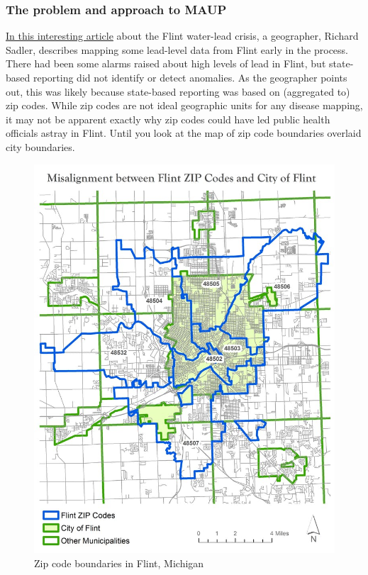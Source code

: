 \documentclass[
]{book}
\begin{document}
\hypertarget{the-problem-and-approach-to-maup}{%
\subsubsection{The problem and approach to MAUP}\label{the-problem-and-approach-to-maup}}

\href{https://theconversation.com/how-zip-codes-nearly-masked-the-lead-problem-in-flint-65626}{In this interesting article} about the Flint water-lead crisis, a geographer, Richard Sadler, describes mapping some lead-level data from Flint early in the process. There had been some alarms raised about high levels of lead in Flint, but state-based reporting did not identify or detect anomalies. As the geographer points out, this was likely because state-based reporting was based on (aggregated to) zip codes. While zip codes are not ideal geographic units for any disease mapping, it may not be apparent exactly why zip codes could have led public health officials astray in Flint. Until you look at the map of zip code boundaries overlaid city boundaries.

\begin{figure}
\centering
\includegraphics{images/flint-maup.jpg}
\caption{\label{fig:unnamed-chunk-65}Zip code boundaries in Flint, Michigan}
\end{figure}
\end{document}
